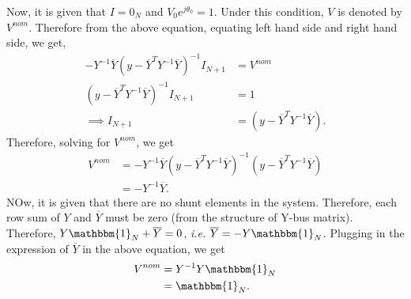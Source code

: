 Now, it is given that $I = 0_{N}$ and $V_0e^{j\theta_0} = 1$. Under this condition, $V$ is denoted by $V^{nom}$. Therefore from the above equation, equating left hand side and right hand side, we get,
\begin{align*}
	-Y^{-1}\overline{Y}(y-\overline{Y}^TY^{-1}\overline{Y})^{-1}I_{N+1} &= V^{nom}\\
	(y-\overline{Y}^TY^{-1}\overline{Y})^{-1}I_{N+1} &= 1\\
	\implies I_{N+1} &= (y-\overline{Y}^TY^{-1}\overline{Y}).
\end{align*}
Therefore, solving for $V^{nom}$, we get
\begin{align*}
	V^{nom} &= -Y^{-1}\overline{Y}(y-\overline{Y}^TY^{-1}\overline{Y})^{-1}(y-\overline{Y}^TY^{-1}\overline{Y})\\
	&= -Y^{-1}\overline{Y}.
\end{align*}
NOw, it is given that there are no shunt elements in the system. Therefore, each row sum of $Y$ and $\overline{Y}$ must be zero (from the structure of Y-bus matrix). Therefore, $Y\mathbbm{1}_N + \overline{Y}=0$, \textit{i.e.} $\overline{Y} = -Y\mathbbm{1}_N$. Plugging in the expression of $\overline{Y}$ in the above equation, we get
\begin{align*}
	V^{nom} &= Y^{-1}Y\mathbbm{1}_N\\
	&= \mathbbm{1}_N.
\end{align*}
